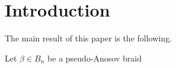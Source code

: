 \chapter{Introduction}

    
    
    The main result of this paper is the following.
    \begin{thm}
        Let \(\beta\in B_n\) be a pseudo-Anosov braid
    \end{thm}